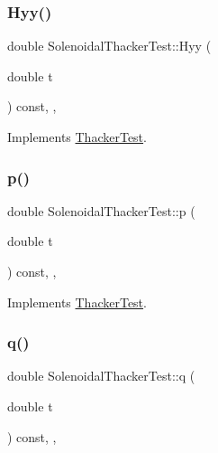 \subsubsection{\texorpdfstring{Hyy()}{Hyy()}}
{\footnotesize\ttfamily double Solenoidal\+Thacker\+Test\+::\+Hyy (\begin{DoxyParamCaption}\item[{double}]{t }\end{DoxyParamCaption}) const\hspace{0.3cm}{\ttfamily [inline]}, {\ttfamily [override]}, {\ttfamily [virtual]}}



Implements \hyperlink{classThackerTest_a4cdc886e1127e7f160cae4ed8e49f2d7}{Thacker\+Test}.

\mbox{\label{classSolenoidalThackerTest_a15f701fed7e7e58ed0f38b000d0e4c60}} 
\subsubsection{\texorpdfstring{p()}{p()}}
{\footnotesize\ttfamily double Solenoidal\+Thacker\+Test\+::p (\begin{DoxyParamCaption}\item[{double}]{t }\end{DoxyParamCaption}) const\hspace{0.3cm}{\ttfamily [inline]}, {\ttfamily [override]}, {\ttfamily [virtual]}}



Implements \hyperlink{classThackerTest_a9174c2c16088c48c1ece4356289e4a6c}{Thacker\+Test}.

\mbox{\label{classSolenoidalThackerTest_af0ae968cf43321ae5a6de214c5a9d421}} 
\subsubsection{\texorpdfstring{q()}{q()}}
{\footnotesize\ttfamily double Solenoidal\+Thacker\+Test\+::q (\begin{DoxyParamCaption}\item[{double}]{t }\end{DoxyParamCaption}) const\hspace{0.3cm}{\ttfamily [inline]}, {\ttfamily [override]}, {\ttfamily [virtual]}}



